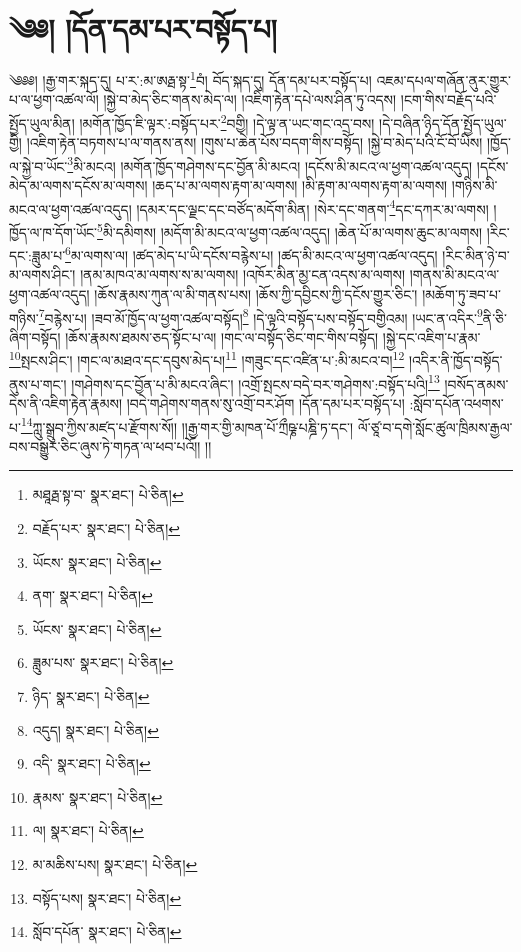 \setcounter{footnote}{0} 
\chapter{༄༅། །དོན་དམ་པར་བསྟོད་པ།}༄༅༅། །རྒྱ་གར་སྐད་དུ། པ་ར་:མ་ཨརྠ་སྟ་\footnote{མཐཱརྠ་སྟ་བ་  སྣར་ཐང་།  པེ་ཅིན། }བཾ། བོད་སྐད་དུ། དོན་དམ་པར་བསྟོད་པ། འཇམ་དཔལ་གཞོན་ནུར་གྱུར་པ་ལ་ཕྱག་འཚལ་ལོ། །སྐྱེ་བ་མེད་ཅིང་གནས་མེད་ལ། །འཇིག་རྟེན་དཔེ་ལས་ཤིན་ཏུ་འདས། །ངག་གིས་བརྗོད་པའི་སྤྱོད་ཡུལ་མིན། །མགོན་ཁྱོད་ཇི་ལྟར་:བསྟོད་པར་\footnote{བརྗོད་པར་  སྣར་ཐང་།  པེ་ཅིན། }བགྱི། །དེ་ལྟ་ན་ཡང་གང་འདྲ་བས། །དེ་བཞིན་ཉིད་དོན་སྤྱོད་ཡུལ་གྱི། །འཇིག་རྟེན་བཏགས་པ་ལ་གནས་ནས། །གུས་པ་ཆེན་པོས་བདག་གིས་བསྟོད། །སྐྱེ་བ་མེད་པའི་ངོ་བོ་ཡིས། །ཁྱོད་ལ་སྐྱེ་བ་ཡོང་\footnote{ཡོངས་  སྣར་ཐང་།  པེ་ཅིན། }མི་མངའ། །མགོན་ཁྱོད་གཤེགས་དང་བྱོན་མི་མངའ། །དངོས་མི་མངའ་ལ་ཕྱག་འཚལ་འདུད། །དངོས་མེད་མ་ལགས་དངོས་མ་ལགས། །ཆད་པ་མ་ལགས་རྟག་མ་ལགས། །མི་རྟག་མ་ལགས་རྟག་མ་ལགས། །གཉིས་མི་མངའ་ལ་ཕྱག་འཚལ་འདུད། །དམར་དང་ལྗང་དང་བཙོད་མདོག་མིན། །སེར་དང་གནག་\footnote{ནག་  སྣར་ཐང་།  པེ་ཅིན། }དང་དཀར་མ་ལགས། །ཁྱོད་ལ་ཁ་དོག་ཡོང་\footnote{ཡོངས་  སྣར་ཐང་།  པེ་ཅིན། }མི་དམིགས། །མདོག་མི་མངའ་ལ་ཕྱག་འཚལ་འདུད། །ཆེན་པོ་མ་ལགས་ཆུང་མ་ལགས། །རིང་དང་:ཟླུམ་པ་\footnote{ཟླུམ་པས་  སྣར་ཐང་།  པེ་ཅིན། }མ་ལགས་ལ། །ཚད་མེད་པ་ཡི་དངོས་བརྙེས་པ། །ཚད་མི་མངའ་ལ་ཕྱག་འཚལ་འདུད། །རིང་མིན་ཉེ་བ་མ་ལགས་ཤིང་། །ནམ་མཁའ་མ་ལགས་ས་མ་ལགས། །འཁོར་མིན་མྱ་ངན་འདས་མ་ལགས། །གནས་མི་མངའ་ལ་ཕྱག་འཚལ་འདུད། །ཆོས་རྣམས་ཀུན་ལ་མི་གནས་པས། །ཆོས་ཀྱི་དབྱིངས་ཀྱི་དངོས་གྱུར་ཅིང་། །མཆོག་ཏུ་ཟབ་པ་གཉིས་\footnote{ཉིད་  སྣར་ཐང་།  པེ་ཅིན། }བརྙེས་པ། །ཟབ་མོ་ཁྱོད་ལ་ཕྱག་འཚལ་བསྟོད།\footnote{འདུད།  སྣར་ཐང་།  པེ་ཅིན། } །དེ་ལྟའི་བསྟོད་པས་བསྟོད་བགྱིའམ། །ཡང་ན་འདིར་\footnote{འདི་  སྣར་ཐང་།  པེ་ཅིན། }ནི་ཅི་ཞིག་བསྟོད། །ཆོས་རྣམས་ཐམས་ཅད་སྟོང་པ་ལ། །གང་ལ་བསྟོད་ཅིང་གང་གིས་བསྟོད། །སྐྱེ་དང་འཇིག་པ་རྣམ་\footnote{རྣམས་  སྣར་ཐང་།  པེ་ཅིན། }སྤངས་ཤིང་། །གང་ལ་མཐའ་དང་དབུས་མེད་པ།\footnote{ལ།  སྣར་ཐང་།  པེ་ཅིན། } །གཟུང་དང་འཛིན་པ་:མི་མངའ་བ།\footnote{མ་མཆིས་པས།  སྣར་ཐང་།  པེ་ཅིན། } །འདིར་ནི་ཁྱོད་བསྟོད་ནུས་པ་གང་། །གཤེགས་དང་བྱོན་པ་མི་མངའ་ཞིང་། །འགྲོ་སྤངས་བདེ་བར་གཤེགས་:བསྟོད་པའི།\footnote{བསྟོད་པས།  སྣར་ཐང་།  པེ་ཅིན། } །བསོད་ནམས་དེས་ནི་འཇིག་རྟེན་རྣམས། །བདེ་གཤེགས་གནས་སུ་འགྲོ་བར་ཤོག །དོན་དམ་པར་བསྟོད་པ། :སློབ་དཔོན་འཕགས་པ་\footnote{སློབ་དཔོན་  སྣར་ཐང་།  པེ་ཅིན། }ཀླུ་སྒྲུབ་ཀྱིས་མཛད་པ་རྫོགས་སོ།། །།རྒྱ་གར་གྱི་མཁན་པོ་ཀྲྀཥྞ་པཎྜི་ཏ་དང་། ལོ་ཙཱ་བ་དགེ་སློང་ཚུལ་ཁྲིམས་རྒྱལ་བས་བསྒྱུར་ཅིང་ཞུས་ཏེ་གཏན་ལ་ཕབ་པའོ།། །།